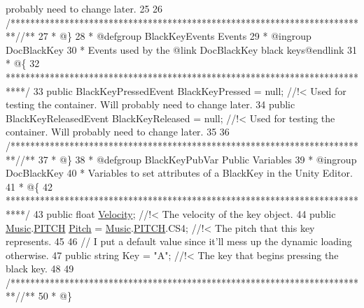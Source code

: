 \begin{DoxyCodeInclude}
{       probably need to change later.}
25 \textcolor{comment}{}
26     \textcolor{comment}{/*************************************************************************/}\textcolor{comment}{/** }
27 \textcolor{comment}{     * @\}}
28 \textcolor{comment}{     * @defgroup BlackKeyEvents Events}
29 \textcolor{comment}{     * @ingroup DocBlackKey}
30 \textcolor{comment}{     * Events used by the @link DocBlackKey black keys@endlink}
31 \textcolor{comment}{     * @\{}
32 \textcolor{comment}{    ****************************************************************************/}
33     \textcolor{keyword}{public} BlackKeyPressedEvent BlackKeyPressed = null; \textcolor{comment}{//!< Used for testing the container. Will probably
       need to change later.}
34 \textcolor{comment}{}    \textcolor{keyword}{public} BlackKeyReleasedEvent BlackKeyReleased = null; \textcolor{comment}{//!< Used for testing the container. Will
       probably need to change later.}
35 \textcolor{comment}{}
36     \textcolor{comment}{/*************************************************************************/}\textcolor{comment}{/** }
37 \textcolor{comment}{     * @\}}
38 \textcolor{comment}{     * @defgroup BlackKeyPubVar Public Variables}
39 \textcolor{comment}{     * @ingroup DocBlackKey}
40 \textcolor{comment}{     * Variables to set attributes of a BlackKey in the Unity Editor.}
41 \textcolor{comment}{     * @\{}
42 \textcolor{comment}{    ****************************************************************************/}
43     \textcolor{keyword}{public} \textcolor{keywordtype}{float} \hyperlink{group___black_key_pub_var_ga6fb983b09b3b6f80eab375fcb43010c1}{Velocity}; \textcolor{comment}{//!< The velocity of the key object.}
44 \textcolor{comment}{}    \textcolor{keyword}{public} \hyperlink{class_music}{Music}.\hyperlink{group___music_enums_ga508f69b199ea518f935486c990edac1d}{PITCH} \hyperlink{group___black_key_pub_var_gad233c456182c9cef7c01486484940439}{Pitch} = \hyperlink{class_music}{Music}.\hyperlink{group___music_enums_ga508f69b199ea518f935486c990edac1d}{PITCH}.CS4; \textcolor{comment}{//!< The pitch that this key
       represents.}
45 \textcolor{comment}{}
46     \textcolor{comment}{// I put a default value since it'll mess up the dynamic loading otherwise.}
47     \textcolor{keyword}{public} \textcolor{keywordtype}{string} Key = \textcolor{stringliteral}{"A"}; \textcolor{comment}{//!< The key that begins pressing the black key. }
48 \textcolor{comment}{}
49     \textcolor{comment}{/*************************************************************************/}\textcolor{comment}{/** }
50 \textcolor{comment}{     * @\}}

\end{DoxyCodeInclude}
